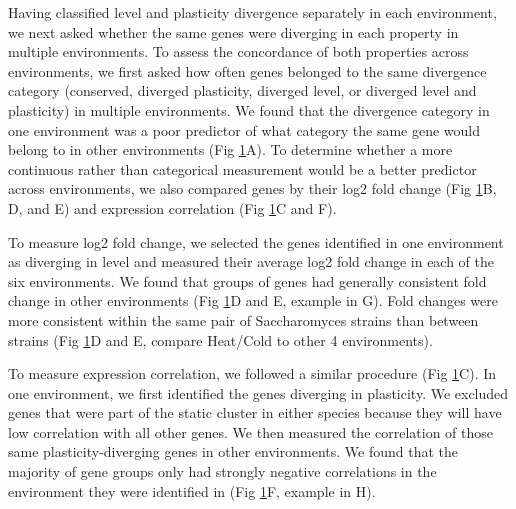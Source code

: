 Having classified level and plasticity divergence separately in each environment, we next asked whether the same genes were diverging in each property in multiple environments. To assess the concordance of both properties across environments, we first asked how often genes belonged to the same divergence category (conserved, diverged plasticity, diverged level, or diverged level and plasticity) in multiple environments. We found that the divergence category in one environment was a poor predictor of what category the same gene would belong to in other environments (Fig \ref{fig:patterns}A). To determine whether a more continuous rather than categorical measurement would be a better predictor across environments, we also compared genes by their log2 fold change (Fig \ref{fig:patterns}B, D, and E) and expression correlation (Fig \ref{fig:patterns}C and F).

To measure log2 fold change, we selected the genes identified in one environment as diverging in level and measured their average log2 fold change in each of the six environments. We found that groups of genes had generally consistent fold change in other environments (Fig \ref{fig:patterns}D and E, example in G). Fold changes were more consistent within the same pair of Saccharomyces strains than between strains (Fig \ref{fig:patterns}D and E, compare Heat/Cold to other 4 environments).

To measure expression correlation, we followed a similar procedure (Fig \ref{fig:patterns}C). In one environment, we first identified the genes diverging in plasticity. We excluded genes that were part of the static cluster in either species because they will have low correlation with all other genes. We then measured the correlation of those same plasticity-diverging genes in other environments. We found that the majority of gene groups only had strongly negative correlations in the environment they were identified in (Fig \ref{fig:patterns}F, example in H).

\begin{figure}
    \centering
    \label{fig:patterns}
\end{figure}

